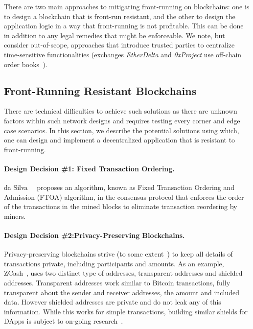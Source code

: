 There are two main approaches to mitigating front-running on blockchains: one is to design a blockchain that is front-run resistant, and the other to design the application logic in a way that front-running is not profitable. This can be done in addition to any legal remedies that might be enforceable. We note, but consider out-of-scope, approaches that introduce trusted parties to centralize time-sensitive functionalities (\eg exchanges \textit{EtherDelta} and \textit{0xProject} use off-chain order books~\cite{warren20170x,0xfrontrunning:online}). 



\subsection{Front-Running Resistant Blockchains}
There are technical difficulties to achieve such solutions as there are unknown factors within such network designs and requires testing every corner and edge case scenarios. In this section, we describe the potential solutions using which, one can design and implement a decentralized application that is resistant to front-running.

\paragraph{Design Decision \#1: Fixed Transaction Ordering.} da Silva~\etal~\cite{fixedordering2018silva} proposes an algorithm, known as Fixed Transaction Ordering and Admission (FTOA) algorithm, in the consensus protocol that enforces the order of the transactions in the mined blocks to eliminate transaction reordering by miners. 

\paragraph{Design Decision \#2:Privacy-Preserving Blockchains.} %
Privacy-preserving blockchains strive (to some extent~\cite{miller2017empirical, kappos2018empirical}) to keep all details of transactions private, including participants and amounts. As an example, ZCash~\cite{hopwood2016zcash}, uses two distinct type of addresses, transparent addresses and shielded addresses. Transparent addresses work similar to Bitcoin transactions, fully transparent about the sender and receiver addresses, the amount and included data. However shielded addresses are private and do not leak any of this information. While this works for simple transactions, building similar shields for DApps is subject to on-going research~\cite{kosba2016hawk}. 

